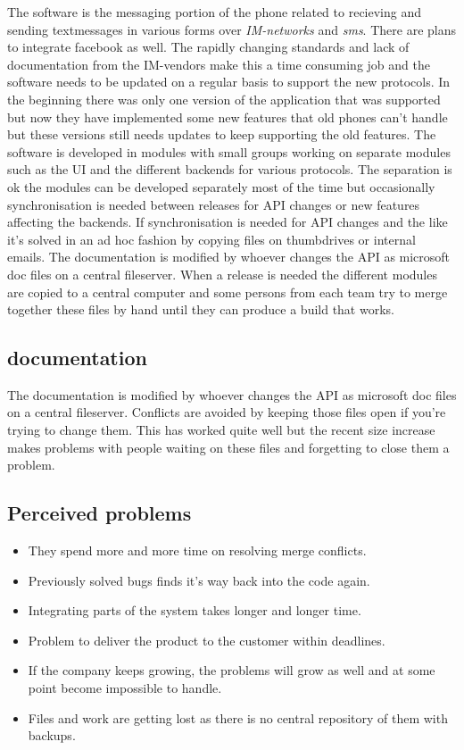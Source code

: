 \documentclass[a4paper,10pt]{article}
\begin{document}
The software is the messaging portion of the phone related to recieving and sending textmessages in various forms over \emph{IM-networks} and  \emph{sms}. There are plans to integrate facebook as well.
The rapidly changing standards and lack of documentation from the IM-vendors make this a time consuming job and the software needs to be updated on a regular basis to support the new protocols.
In the beginning there was only one version of the application that was supported but now they have implemented some new features that old phones can't handle but these versions still needs updates to keep supporting the old features.
The software is developed in modules with small groups working on separate modules such as the UI and the different backends for various protocols.
The separation is ok the modules can be developed separately most of the time but occasionally synchronisation is needed between releases for API changes or new features affecting the backends.
If synchronisation is needed for API changes and the like it's solved in an ad hoc fashion by copying files on thumbdrives or internal emails.
The documentation is modified by whoever changes the API as microsoft doc files on a central fileserver.
When a release is needed the different modules are copied to a central computer and some persons from each team try to merge together these files by hand until they can produce a build that works.

\subsection{documentation}
The documentation is modified by whoever changes the API as microsoft doc files on a central fileserver.
Conflicts are avoided by keeping those files open if you're trying to change them.
This has worked quite well but the recent size increase makes problems with people waiting on these files and forgetting to close them a problem.


\subsection{Perceived problems}

\begin{itemize}
\item They spend more and more time on resolving merge conflicts.
\item Previously solved bugs finds it’s way back into the code again.
\item Integrating parts of the system takes longer and longer time.
\item Problem to deliver the product to the customer within deadlines.
\item If the company keeps growing, the problems will grow as well and at some point become impossible to handle.
\item Files and work are getting lost as there is no central repository of them with backups.
\end{itemize}
\end{document}
